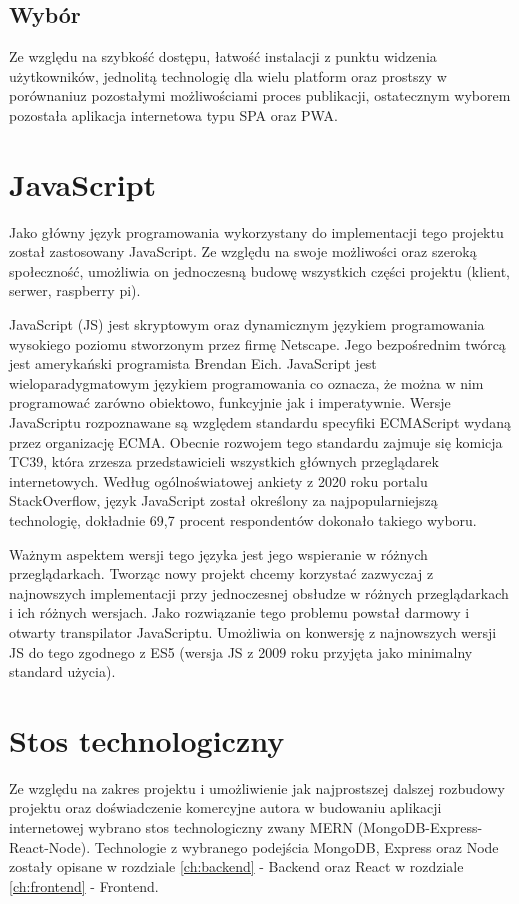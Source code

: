 \subsection{Wybór}
Ze względu na szybkość dostępu, łatwość instalacji z punktu widzenia użytkowników, jednolitą technologię dla wielu platform oraz prostszy w porównaniu\newline z pozostałymi możliwościami proces publikacji, ostatecznym wyborem pozostała aplikacja internetowa typu SPA oraz PWA.

\section{JavaScript}
Jako główny język programowania wykorzystany do implementacji tego projektu został zastosowany JavaScript. Ze względu na swoje możliwości oraz szeroką społeczność, umożliwia on jednoczesną budowę wszystkich części projektu (klient, serwer, raspberry pi).

JavaScript (JS) jest skryptowym oraz dynamicznym językiem programowania wysokiego poziomu stworzonym przez firmę Netscape. Jego bezpośrednim twórcą jest amerykański programista Brendan Eich. JavaScript jest wieloparadygmatowym językiem programowania co oznacza, że można w nim programować zarówno obiektowo, funkcyjnie jak i imperatywnie. Wersje JavaScriptu rozpoznawane są względem standardu specyfiki ECMAScript wydaną przez organizację ECMA. Obecnie rozwojem tego standardu zajmuje się komicja TC39, która zrzesza przedstawicieli wszystkich głównych przeglądarek internetowych. \cite{JavaScriptBasics} Według ogólnoświatowej ankiety z 2020 roku portalu StackOverflow, język JavaScript został określony za najpopularniejszą technologię, dokładnie 69,7 procent respondentów dokonało takiego wyboru. \cite{StackOverflowSurvey}

Ważnym aspektem wersji tego języka jest jego wspieranie w różnych przeglądarkach. Tworząc nowy projekt chcemy korzystać zazwyczaj z najnowszych implementacji przy jednoczesnej obsłudze w różnych przeglądarkach i ich różnych wersjach. Jako rozwiązanie tego problemu powstał darmowy i otwarty transpilator JavaScriptu. Umożliwia on konwersję z najnowszych wersji JS do tego zgodnego z ES5 (wersja JS z 2009 roku przyjęta jako minimalny standard użycia).

\section{Stos technologiczny}
Ze względu na zakres projektu i umożliwienie jak najprostszej dalszej rozbudowy projektu oraz doświadczenie komercyjne autora w budowaniu aplikacji internetowej wybrano stos technologiczny zwany MERN (MongoDB-Express-React-Node). Technologie z wybranego podejścia MongoDB, Express oraz Node zostały opisane w rozdziale \ref{ch:backend} - Backend oraz React w rozdziale \ref{ch:frontend} - Frontend.

